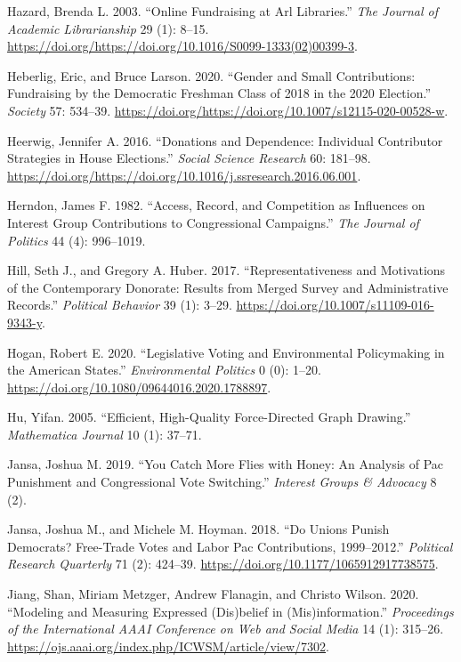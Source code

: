 \documentclass[12pt,]{article}
\begin{document}
\leavevmode\hypertarget{ref-hazard2003}{}%
Hazard, Brenda L. 2003. ``Online Fundraising at Arl Libraries.''
\emph{The Journal of Academic Librarianship} 29 (1): 8--15.
\url{https://doi.org/https://doi.org/10.1016/S0099-1333(02)00399-3}.

\leavevmode\hypertarget{ref-heberlig2020}{}%
Heberlig, Eric, and Bruce Larson. 2020. ``Gender and Small
Contributions: Fundraising by the Democratic Freshman Class of 2018 in
the 2020 Election.'' \emph{Society} 57: 534--39.
\url{https://doi.org/https://doi.org/10.1007/s12115-020-00528-w}.

\leavevmode\hypertarget{ref-heerwig2016}{}%
Heerwig, Jennifer A. 2016. ``Donations and Dependence: Individual
Contributor Strategies in House Elections.'' \emph{Social Science
Research} 60: 181--98.
\url{https://doi.org/https://doi.org/10.1016/j.ssresearch.2016.06.001}.

\leavevmode\hypertarget{ref-herndon1982}{}%
Herndon, James F. 1982. ``Access, Record, and Competition as Influences
on Interest Group Contributions to Congressional Campaigns.'' \emph{The
Journal of Politics} 44 (4): 996--1019.

\leavevmode\hypertarget{ref-hill2017}{}%
Hill, Seth J., and Gregory A. Huber. 2017. ``Representativeness and
Motivations of the Contemporary Donorate: Results from Merged Survey and
Administrative Records.'' \emph{Political Behavior} 39 (1): 3--29.
\url{https://doi.org/10.1007/s11109-016-9343-y}.

\leavevmode\hypertarget{ref-hogan2020}{}%
Hogan, Robert E. 2020. ``Legislative Voting and Environmental
Policymaking in the American States.'' \emph{Environmental Politics} 0
(0): 1--20. \url{https://doi.org/10.1080/09644016.2020.1788897}.

\leavevmode\hypertarget{ref-yifanhu}{}%
Hu, Yifan. 2005. ``Efficient, High-Quality Force-Directed Graph
Drawing.'' \emph{Mathematica Journal} 10 (1): 37--71.

\leavevmode\hypertarget{ref-jansa2019}{}%
Jansa, Joshua M. 2019. ``You Catch More Flies with Honey: An Analysis of
Pac Punishment and Congressional Vote Switching.'' \emph{Interest Groups
\& Advocacy} 8 (2).

\leavevmode\hypertarget{ref-jansa2018}{}%
Jansa, Joshua M., and Michele M. Hoyman. 2018. ``Do Unions Punish
Democrats? Free-Trade Votes and Labor Pac Contributions, 1999--2012.''
\emph{Political Research Quarterly} 71 (2): 424--39.
\url{https://doi.org/10.1177/1065912917738575}.

\leavevmode\hypertarget{ref-jiang2020}{}%
Jiang, Shan, Miriam Metzger, Andrew Flanagin, and Christo Wilson. 2020.
``Modeling and Measuring Expressed (Dis)belief in (Mis)information.''
\emph{Proceedings of the International AAAI Conference on Web and Social
Media} 14 (1): 315--26.
\url{https://ojs.aaai.org/index.php/ICWSM/article/view/7302}.
\end{document}

